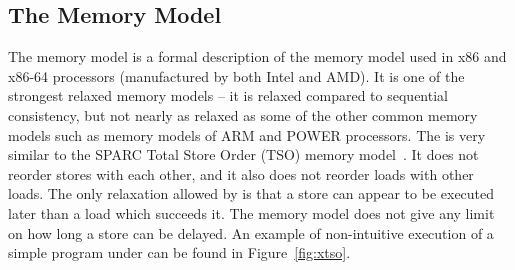 \subsection{The \xtso Memory Model}


The \xtso memory model is a formal description of the memory model used in x86
and x86-64 processors (manufactured by both Intel and AMD).
It is one of the strongest relaxed memory models -- it is relaxed compared to
sequential consistency, but not nearly as relaxed as some of the other common
memory models such as memory models of ARM and POWER processors.
The \xtso is very similar to the SPARC Total Store Order (TSO) memory
model~.
It does not reorder stores with each other, and it also does not reorder loads
with other loads.
The only relaxation allowed by \xtso is that a store can appear to be executed
later than a load which succeeds it.
The memory model does not give any limit on how long a store can be delayed.
An example of non-intuitive execution of a simple program under \xtso can be
found in Figure~\ref{fig:xtso}.

